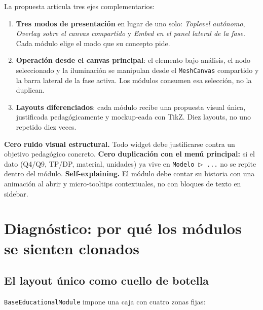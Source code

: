 \documentclass[11pt,a4paper]{article}
\begin{document}
La propuesta articula tres ejes complementarios:

\begin{enumerate}[leftmargin=1.2em, itemsep=2pt]
  \item \textbf{Tres modos de presentación} en lugar de uno solo:
        \emph{Toplevel autónomo}, \emph{Overlay sobre el canvas compartido} y
        \emph{Embed en el panel lateral de la fase}. Cada módulo elige el modo
        que su concepto pide.
  \item \textbf{Operación desde el canvas principal}: el elemento bajo análisis,
        el nodo seleccionado y la iluminación se manipulan desde el
        \texttt{MeshCanvas} compartido y la barra lateral de la fase activa.
        Los módulos consumen esa selección, no la duplican.
  \item \textbf{Layouts diferenciados}: cada módulo recibe una propuesta visual
        única, justificada pedagógicamente y mockup-eada con TikZ. Diez
        layouts, no uno repetido diez veces.
\end{enumerate}

\begin{ideaBox}
\textbf{Cero ruido visual estructural.} Todo widget debe justificarse contra
un objetivo pedagógico concreto. \textbf{Cero duplicación con el menú principal:}
si el dato (Q4/Q9, TP/DP, material, unidades) ya vive en \texttt{Modelo\,$\triangleright$\,...}
no se repite dentro del módulo. \textbf{Self-explaining.} El módulo debe
contar su historia con una animación al abrir y micro-tooltips contextuales,
no con bloques de texto en sidebar.
\end{ideaBox}

\tableofcontents
\newpage

\section{Diagnóstico: por qué los módulos se sienten clonados}

\subsection{El layout único como cuello de botella}

\texttt{BaseEducationalModule} impone una caja con cuatro zonas fijas:
\end{document}
